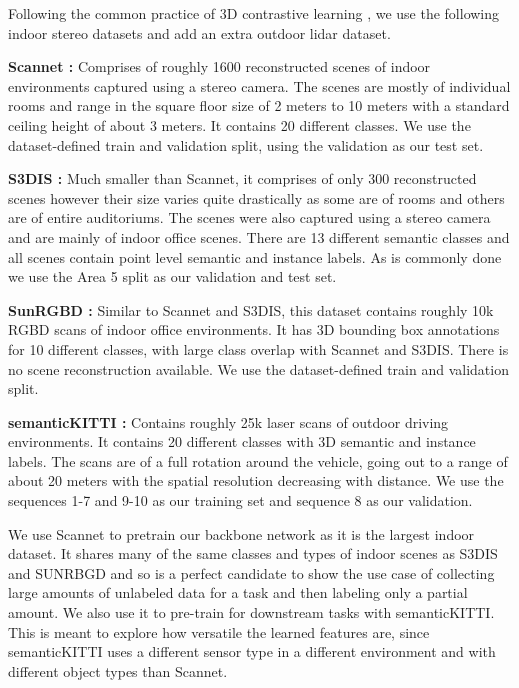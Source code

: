 \documentclass[10pt,twocolumn,letterpaper]{article}
\begin{document}
Following the common practice of 3D contrastive learning \cite{xie2020pointcontrast, hou2021Exploring, zhang2021Self, jiang2021Guided}, we use the following indoor stereo datasets and add an extra outdoor lidar dataset.

\textbf{Scannet \cite{Dai2017ScanNet}:} Comprises of roughly 1600 reconstructed scenes of indoor environments captured using a stereo camera. The scenes are mostly of individual rooms and range in the square floor size of 2 meters to 10 meters with a standard ceiling height of about 3 meters. It contains 20 different classes. We use the dataset-defined train and validation split, using the validation as our test set.

\textbf{S3DIS \cite{armeni20163D}:} Much smaller than Scannet, it comprises of only 300 reconstructed scenes however their size varies quite drastically as some are of rooms and others are of entire auditoriums. The scenes were also captured using a stereo camera and are mainly of indoor office scenes. There are 13 different semantic classes and all scenes contain point level semantic and instance labels. As is commonly done \cite{xie2020pointcontrast, hou2021Exploring} we use the Area 5 split as our validation and test set.

\textbf{SunRGBD \cite{song2015sunrgbd, janoch2011category, xiao2013database, silberman2012indoor}:} Similar to Scannet and S3DIS, this dataset contains roughly 10k RGBD scans of indoor office environments. It has 3D bounding box annotations for 10 different classes, with large class overlap with Scannet and S3DIS. There is no scene reconstruction available. We use the dataset-defined train and validation split.

\textbf{semanticKITTI \cite{behley2019semantic, geiger2012are}: } Contains roughly 25k laser scans of outdoor driving environments. It contains 20 different classes with 3D semantic and instance labels. The scans are of a full rotation around the vehicle, going out to a range of about 20 meters with the spatial resolution decreasing with distance. We use the sequences 1-7 and 9-10 as our training set and sequence 8 as our validation.

We use Scannet to pretrain our backbone network as it is the largest indoor dataset. It shares many of the same classes and types of indoor scenes as S3DIS and SUNRBGD and so is a perfect candidate to show the use case of collecting large amounts of unlabeled data for a task and then labeling only a partial amount. We also use it to pre-train for downstream tasks with semanticKITTI. This is meant to explore how versatile the learned features are, since semanticKITTI uses a different sensor type in a different environment and with different object types than Scannet.
\end{document}

